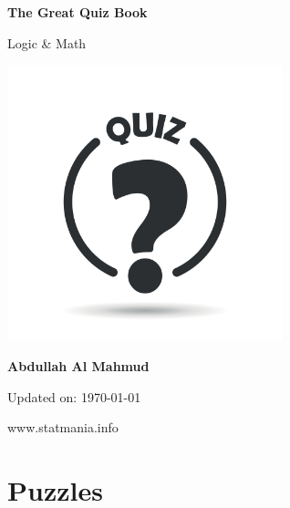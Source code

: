 \documentclass[13pt]{article}
\begin{document}
\begin{titlepage}
    \begin{center}
        \vspace*{1cm}
            
        \Huge
        \textbf{The Great Quiz Book}
            
        \vspace{0.5cm}
        \huge
        Logic \& Math
        
        \includegraphics[width=8cm]{img/quiz.jpg}
            
        \vspace{1.5cm}
            
        \textbf{Abdullah Al Mahmud}

     \vspace{1.5cm}

	\Large 
	Updated on: \today
	
	
            
        \vfill
            

            
        \vspace{0.8cm}
            

            
        \Large
        www.statmania.info\\
            
    \end{center}
\end{titlepage}

\section{Puzzles}
\end{document}
